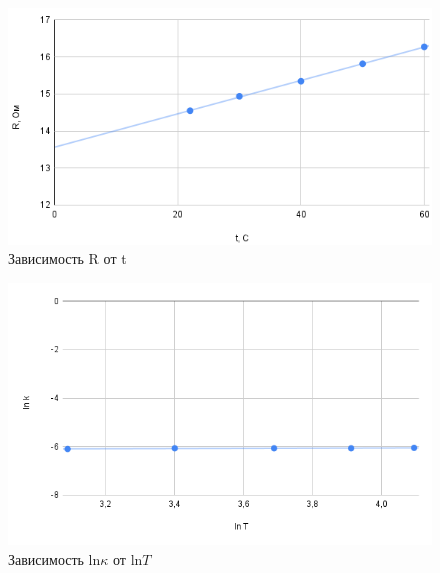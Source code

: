 \documentclass[a4paper,12pt]{article}
\begin{document}
\begin{figure}[h]
    \centering
    \includegraphics[width=0.7\linewidth]{RTc.png}
    \caption{Зависимость R от t}
    \label{fig:my_label}
\end{figure}
\begin{figure}[h]
    \centering
    \includegraphics[width=0.7\linewidth]{ln.png}
    \caption{Зависимость ln$\kappa$ от ln$T$}
    \label{fig:my_label}
\end{figure}
\end{document}

